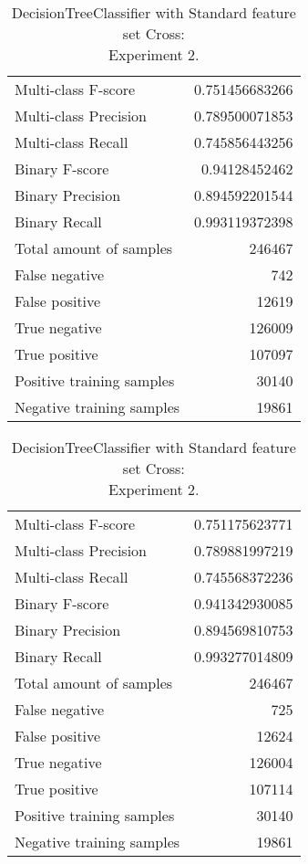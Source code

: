 \begin{table}[H]
\begin{minipage}{0.5\textwidth}
\caption{DecisionTreeClassifier with Standard feature set Cross: \\Experiment 1.}
\centering
\begin{tabular}{l r}
\toprule
Multi-class F-score & 0.751456683266 \\
Multi-class Precision & 0.789500071853 \\
Multi-class Recall & 0.745856443256 \\
\midrule
Binary F-score & 0.94128452462 \\
Binary Precision & 0.894592201544 \\
Binary Recall & 0.993119372398 \\
\midrule
Total amount of samples & 246467 \\
False negative & 742 \\
False positive & 12619 \\
True negative & 126009 \\
True positive & 107097 \\
\midrule
Positive training samples & 30140 \\
Negative training samples & 19861 \\
\bottomrule
\end{tabular}
\end{minipage}
\hfillx
\begin{minipage}{0.5\textwidth}
\caption{DecisionTreeClassifier with Standard feature set Cross: \\Experiment 2.}
\centering
\begin{tabular}{l r}
\toprule
Multi-class F-score & 0.751175623771 \\
Multi-class Precision & 0.789881997219 \\
Multi-class Recall & 0.745568372236 \\
\midrule
Binary F-score & 0.941342930085 \\
Binary Precision & 0.894569810753 \\
Binary Recall & 0.993277014809 \\
\midrule
Total amount of samples & 246467 \\
False negative & 725 \\
False positive & 12624 \\
True negative & 126004 \\
True positive & 107114 \\
\midrule
Positive training samples & 30140 \\
Negative training samples & 19861 \\
\bottomrule
\end{tabular}
\end{minipage}
\end{table}

